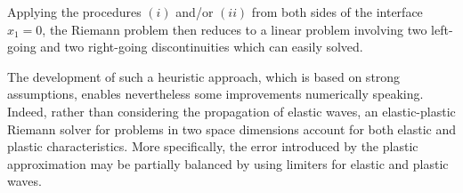 Applying the procedures $(i)$ and/or $(ii)$ from both sides of the interface $x_1=0$, the Riemann problem then reduces to a linear problem involving two left-going and two right-going discontinuities which can easily solved.
 
The development of such a heuristic approach, which is based on strong assumptions, enables nevertheless some improvements numerically speaking.
Indeed, rather than considering the propagation of elastic waves, an elastic-plastic Riemann solver for problems in two space dimensions account for both elastic and plastic characteristics.
More specifically, the error introduced by the plastic approximation may be partially balanced by using limiters for elastic and plastic waves.






